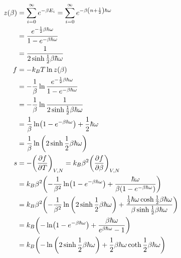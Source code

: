 \documentclass[uplatex,dvipdfmx,a4paper,11pt]{jlreq}
\theoremstyle{definition}
\begin{document}
\begin{align}
  z(\beta) & = \sum_{i = 0}^{\infty}e^{-\beta E_i} = \sum_{i = 0}^{\infty}e^{-\beta\qty(n + \frac{1}{2})\hbar\omega}                                                                                  \\
           & = \frac{e^{-\frac{1}{2}\beta\hbar\omega}}{1 - e^{-\beta\hbar\omega}}                                                                                                                     \\
           & = \frac{1}{2\sinh \frac{1}{2}\beta\hbar\omega}                                                                                                                                           \\
  f        & = -k_BT\ln z(\beta)                                                                                                                                                                      \\
           & = -\frac{1}{\beta}\ln \frac{e^{-\frac{1}{2}\beta\hbar\omega}}{1 - e^{-\beta\hbar\omega}}                                                                                                 \\
           & = -\frac{1}{\beta}\ln \frac{1}{2\sinh \frac{1}{2}\beta\hbar\omega}                                                                                                                       \\
           & = \frac{1}{\beta}\ln(1 - e^{-\beta\hbar\omega}) + \frac{1}{2}\hbar\omega                                                                                                                 \\
           & = \frac{1}{\beta}\ln\qty(2\sinh \frac{1}{2}\beta\hbar\omega)                                                                                                                             \\
  s        & = - \qty(\pdv{f}{T})_{V,N} = k_B\beta^2\qty(\pdv{f}{\beta})_{V,N}                                                                                                                        \\
           & = k_B\beta^2\qty(-\frac{1}{\beta^2}\ln(1 - e^{-\beta\hbar\omega}) + \frac{\hbar\omega}{\beta(1 - e^{-\beta\hbar\omega})})                                                                \\
           & = k_B\beta^2\qty(-\frac{1}{\beta^2}\ln\qty(2\sinh \frac{1}{2}\beta\hbar\omega) + \frac{\frac{1}{2}\hbar\omega\cosh \frac{1}{2}\beta\hbar\omega}{\beta\sinh \frac{1}{2}\beta\hbar\omega}) \\
           & = k_B\qty(-\ln(1 - e^{-\beta\hbar\omega}) + \frac{\beta\hbar\omega}{e^{\beta\hbar\omega} - 1})                                                                                           \\
           & = k_B\qty(-\ln\qty(2\sinh\frac{1}{2}\beta\hbar\omega) + \frac{1}{2}\beta\hbar\omega\coth\frac{1}{2}\beta\hbar\omega)                                                                     \\
\end{align}
\end{document}
